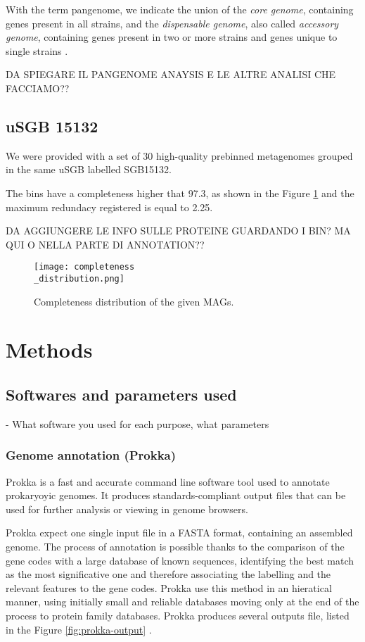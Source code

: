 \documentclass[a4paper,titlepage]{book}
\begin{document}
With the term pangenome, we indicate the union of the \textit{core genome}, containing genes present in all strains, and the \textit{dispensable genome}, also called \textit{accessory genome}, containing genes present in two or more strains and genes unique to single strains \cite{Medini}.


DA SPIEGARE IL PANGENOME ANAYSIS E LE ALTRE ANALISI CHE FACCIAMO??

\section{uSGB 15132}

We were provided with a set of 30 high-quality prebinned metagenomes grouped in the same uSGB labelled SGB15132.

The bins have a completeness higher that 97.3, as shown in the Figure \ref{fig:compl} and the maximum redundacy registered is equal to 2.25.

DA AGGIUNGERE LE INFO SULLE PROTEINE GUARDANDO I BIN? MA QUI O NELLA PARTE DI ANNOTATION??



\begin{figure}[ht]
\centering
\texttt{[image: completeness\\\_distribution.png]}
\caption{Completeness distribution of the given MAGs.}
\label{fig:compl}
\end{figure}

\chapter{Methods}
\section{Softwares and parameters used}
- What software you used for each purpose, what parameters
\subsection{Genome annotation (Prokka)}

Prokka is a fast and accurate command line software tool used to annotate prokaryoyic genomes.  It produces standards-compliant output files that can be used for further analysis or viewing in genome browsers.

Prokka expect one single input file in a FASTA format, containing an assembled genome. The process of annotation is possible thanks to the comparison of the gene codes with a large database of known sequences, identifying the best match as the most significative one and therefore associating the labelling and the relevant features to the gene codes. Prokka use this method in an hieratical manner, using initially small and reliable databases moving only at the end of the process to protein family databases.
Prokka produces several outputs file, listed in the Figure \ref{fig:prokka-output}  \cite{Prokka}.
\end{document}
